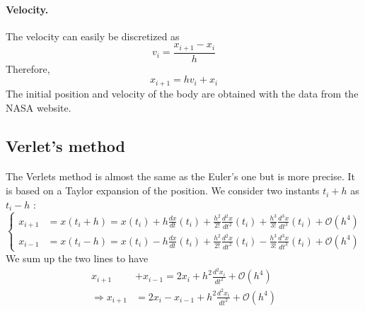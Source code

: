 \documentclass[a4paper, twoside, 11pt]{report}
\theoremstyle{theorem}
\theoremstyle{remark}
\theoremstyle{exemple}
\begin{document}
             \paragraph{Velocity.}The velocity can easily be discretized as
                \begin{equation*}
                      v_i = \frac{x_{i+1}-x_i}{h}
                  \end{equation*}
             Therefore,
                 \begin{equation*}
                    x_{i+1} = hv_i + x_i
                    \tag{9}
                \end{equation*}   
            The initial position and velocity of the body are obtained with the data from the NASA website.
            
        \subsection{Verlet's method}
            \paragraph{}The Verlets method is almost the same as the Euler's one but is more precise. It is based on a Taylor expansion of the position. We consider two instants $t_i+h$ as $t_i-h$ :
                \begin{equation*}
                    \left\{ 
                        \begin{aligned}
                            x_{i+1} &= x(t_i+h) = x(t_i) + h\frac{dx}{dt}(t_i) + \frac{h^2}{2!}\frac{d^2x}{dt^2}(t_i) + \frac{h^3}{3!}\frac{d^3x}{dt^3}(t_i)+\mathcal{O}(h^4)\\
                            x_{i-1} &= x(t_i-h) = x(t_i) - h\frac{dx}{dt}(t_i) + \frac{h^2}{2!}\frac{d^2x}{dt^2}(t_i) - \frac{h^3}{3!}\frac{d^3x}{dt^3}(t_i)+\mathcal{O}(h^4)
                        \end{aligned}
                    \right.
                \end{equation*}
            We sum up the two lines to have
                \begin{align*}
                    x_{i+1} &+ x_{i-1} = 2x_i + h^2\frac{d^2x_i}{dt^2} + \mathcal{O}(h^4) \\
                    \Rightarrow x_{i+1} &= 2x_i - x_{i-1} + h^2\frac{d^2x_i}{dt^2} + \mathcal{O}(h^4)
                \end{align*}
\end{document}
